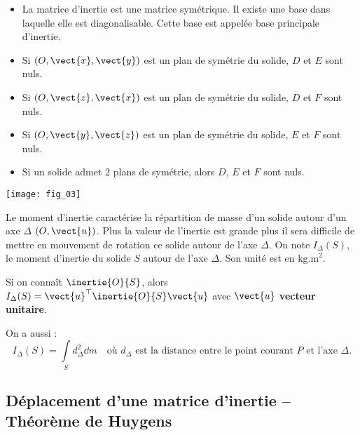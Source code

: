 \begin{prop}

\begin{itemize}%
\item La matrice d'inertie est une matrice symétrique. Il existe une base dans laquelle elle est diagonalisable. Cette base est appelée base principale d'inertie. 
\item Si $\left(O,\vect{x},\vect{y} \right)$ est un plan de symétrie du solide, $D$ et $E$ sont nuls.
\item Si $\left(O,\vect{z},\vect{x} \right)$ est un plan de symétrie du solide, $D$ et $F$ sont nuls.
\item Si $\left(O,\vect{y},\vect{z} \right)$ est un plan de symétrie du solide, $E$ et $F$ sont nuls.
\item Si un solide admet 2 plans de symétrie, alors $D$, $E$ et $F$ sont nuls. 
\end{itemize}

\end{prop}

\begin{marginfigure}
\texttt{[image: fig\_03]}
\end{marginfigure}


\begin{defi}
Le moment d’inertie caractérise la répartition de masse d’un solide autour d’un axe $\Delta$ $\left(O,\vect{u}\right)$. Plus la valeur
de l’inertie est grande plus il sera difficile de mettre en mouvement de rotation ce solide autour de
l’axe $\Delta$. 
On note $I_{\Delta}(S)$, le moment d’inertie du solide $S$ autour de l’axe $\Delta$. Son unité est en $\text{kg.m}^2$.

Si on connaît $\inertie{O}{S}$, alors $I_{\Delta}(S)=\vect{u}^\top\inertie{O}{S}\vect{u}$ avec $\vect{u}$ \textbf{vecteur unitaire}.
\end{defi}


\begin{remarque}
On a aussi : 
$$I_{\Delta}(S)=\int\limits_{S} d_{\Delta}^2 \dd m \quad \text{où } d_{\Delta} \text{ est la distance entre le point courant } P \text{ et l’axe }\Delta.$$

\end{remarque}

\subsection[Déplacement d'une matrice d'inertie]{Déplacement d'une matrice d'inertie -- Théorème de Huygens}

